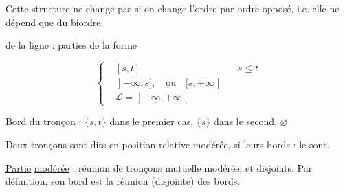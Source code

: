 
Cette structure ne change pas si
on change l'ordre par ordre opposé,
i.e. elle ne dépend que du
biordre.

 


 de la ligne : parties
de la forme

\[
\left\{\begin{aligned}
 &[s,t] &&s\leq t\\
 &\mathopen{]}-\infty,s],\quad\text{ou}\quad [s,+\infty\mathclose{[}\\
 &\mathcal L=\mathopen{]}-\infty,+\infty\mathclose{[}
\end{aligned}\right.
\]

Bord du tronçon : $\{s,t\}$ dans le
premier cas, $\{s\}$ dans le second, $\varnothing$ 

Deux tronçons sont dits en
position relative modérée, si leurs
bords : le sont.

\uline{Partie} \uline{modérée} :
réunion  de tronçons  mutuelle
modérée, et disjoints.  Par
définition, son bord est la réunion
(disjointe) des bords.

